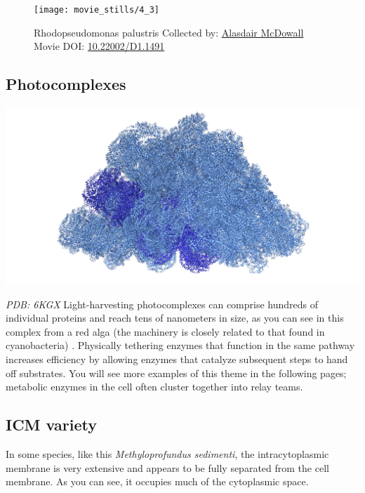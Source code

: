 \documentclass[]{tufte-book}
\begin{document}
\begin{figure}
\texttt{[image: movie\_stills/4\_3]} \caption[Rhodopseudomonas palustris Collected by:
\protect\hyperlink{alasdair_mcdowall}{Alasdair McDowall} Movie DOI:
\href{https://doi.org/10.22002/D1.1491}{10.22002/D1.1491}]{Rhodopseudomonas palustris Collected by:
\protect\hyperlink{alasdair_mcdowall}{Alasdair McDowall} Movie DOI:
\href{https://doi.org/10.22002/D1.1491}{10.22002/D1.1491}}\label{fig:4-3}
\end{figure}

\subsection{Photocomplexes}\label{Photocomplexes}

\includegraphics{img/schematics/4_3_1}

\emph{PDB: 6KGX} Light-harvesting photocomplexes can comprise hundreds
of individual proteins and reach tens of nanometers in size, as you can
see in this complex from a red alga (the machinery is closely related to
that found in cyanobacteria) \citep{ma2020}. Physically tethering
enzymes that function in the same pathway increases efficiency by
allowing enzymes that catalyze subsequent steps to hand off substrates.
You will see more examples of this theme in the following pages;
metabolic enzymes in the cell often cluster together into relay teams.

\hypertarget{ICM_variety}{\subsection{ICM variety}\label{ICM_variety}}

In some species, like this \emph{Methyloprofundus sedimenti}, the
intracytoplasmic membrane is very extensive and appears to be fully
separated from the cell membrane. As you can see, it occupies much of
the cytoplasmic space.
\end{document}
